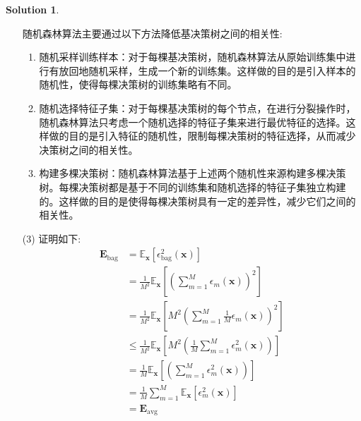 \documentclass[a4paper,UTF8]{article}
\numberwithin{equation}{section}
\theoremstyle{definition}
\newtheorem*{solution}{Solution}
\begin{document}
\begin{solution}
\begin{enumerate}
        随机森林算法主要通过以下方法降低基决策树之间的相关性:
        \begin{enumerate}
            \item 随机采样训练样本：对于每棵基决策树，随机森林算法从原始训练集中进行有放回地随机采样，生成一个新的训练集。这样做的目的是引入样本的随机性，使得每棵决策树的训练集略有不同。
            \item 随机选择特征子集：对于每棵基决策树的每个节点，在进行分裂操作时，随机森林算法只考虑一个随机选择的特征子集来进行最优特征的选择。这样做的目的是引入特征的随机性，限制每棵决策树的特征选择，从而减少决策树之间的相关性。
            \item 构建多棵决策树：随机森林算法基于上述两个随机性来源构建多棵决策树。每棵决策树都是基于不同的训练集和随机选择的特征子集独立构建的。这样做的目的是使得每棵决策树具有一定的差异性，减少它们之间的相关性。
        \end{enumerate}
        \item [(3)]
        证明如下:
        \begin{equation}
            \begin{aligned} \boldsymbol{E}_{\mathrm{bag}} & =\mathbb{E}_{\boldsymbol{x}}\left[\epsilon_{\mathrm{bag}}^{2}(\boldsymbol{x})\right] \\ & =\frac{1}{M^{2}} \mathbb{E}_{\boldsymbol{x}}\left[\left(\sum_{m=1}^{M} \epsilon_{m}(\boldsymbol{x})\right)^{2}\right] \\ &=\frac{1}{M^{2}} \mathbb{E}_{\boldsymbol{x}}\left[M^2\left(\sum_{m=1}^{M}\frac{1}{M} \epsilon_{m}(\boldsymbol{x})\right)^{2}\right]\\& \leq \frac{1}{M^{2}} \mathbb{E}_{\boldsymbol{x}}\left[M^2\left(\frac{1}{M}\sum_{m=1}^{M} \epsilon_{m}^{2}(\boldsymbol{x})\right)\right] \\ & =\frac{1}{M} \mathbb{E}_{\boldsymbol{x}}\left[\left(\sum_{m=1}^{M} \epsilon_{m}^{2}(\boldsymbol{x})\right)\right] \\ & =\frac{1}{M} \sum_{m=1}^{M} \mathbb{E}_{\boldsymbol{x}}\left[\epsilon_{m}^{2}(\boldsymbol{x})\right] \\ & =\boldsymbol{E}_{\mathrm{avg}}\end{aligned} \nonumber
        \end{equation}
    \end{enumerate}
\end{solution}
\end{document}
